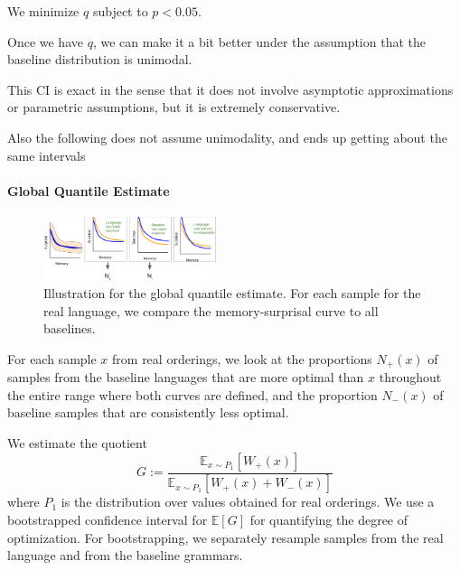 \documentclass[11pt,letterpaper]{article}
\newcommand{\E}[0]{\mathbb{E}}
\begin{document}
We minimize $q$ subject to $p < 0.05$.

Once we have $q$, we can make it a bit better under the assumption that the baseline distribution is unimodal.

This CI is exact in the sense that it does not involve asymptotic approximations or parametric assumptions, but it is extremely conservative.

Also the following does not assume unimodality, and ends up getting about the same intervals




\paragraph{Global Quantile Estimate}


\begin{figure}
	\begin{center}
\includegraphics[width=0.45\textwidth]{figures/quantile-global.png}
\end{center}
	\caption{Illustration for the global quantile estimate. For each sample for the real language, we compare the memory-surprisal curve to all baselines.}\label{fig:quantile-global}
\end{figure}



For each sample $x$ from real orderings, we look at the proportions $N_+(x)$ of samples from the baseline languages that are more optimal than $x$ throughout the entire range where both curves are defined, and the proportion $N_-(x)$ of baseline samples that are consistently less optimal.


We estimate the quotient
\begin{equation}\label{eq:g}
	G :=	\frac{\E_{x \sim P_1}[W_+(x)]}{\E_{x \sim P_1}[W_+(x) + W_-(x)]}
\end{equation}
where $P_1$ is the distribution over values obtained for real orderings.
We use a bootstrapped confidence interval for $\E[G]$ for quantifying the degree of optimization.
For bootstrapping, we separately resample samples from the real language and from the baseline grammars.
\end{document}
